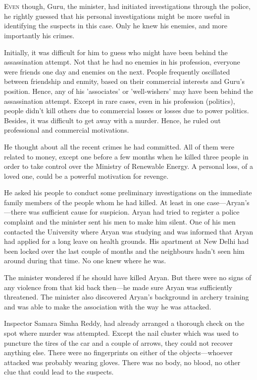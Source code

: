 \chapter{}

\lettrine{E}{ven} though, Guru, the minister, had initiated investigations through the
police, he rightly guessed that his personal investigations might be more useful
in identifying the suspects in this case. Only he knew his enemies, and more
importantly his crimes.

Initially, it was difficult for him to guess who might have been behind the
assassination attempt. Not that he had no enemies in his profession, everyone
were friends one day and enemies on the next. People frequently oscillated
between friendship and enmity, based on their commercial interests and Guru's
position. Hence, any of his 'associates' or 'well-wishers' may have been behind
the assassination attempt. Except in rare cases, even in his profession
(politics), people didn't kill others due to commercial losses or losses due to
power politics. Besides, it was difficult to get away with a murder. Hence, he
ruled out professional and commercial motivations.

He thought about all the recent crimes he had committed. All of them were
related to money, except one before a few months when he killed three people in
order to take control over the Ministry of Renewable Energy. A personal loss, of
a loved one, could be a powerful motivation for revenge.

He asked his people to conduct some preliminary investigations on the immediate
family members of the people whom he had killed. At least in one
case—Aryan's—there was sufficient cause for suspicion. Aryan had tried to register
a police
complaint and the minister sent his men to make him silent. One of his men
contacted the University where Aryan was studying and was informed that Aryan
had applied for a long leave on health grounds. His apartment at New Delhi had
been locked over the last couple of months and the neighbours hadn't seen him
around during that time. No one knew where he was.

The minister wondered if he should have killed Aryan. But there were no signs of
any violence from that kid back then—he made sure Aryan was sufficiently
threatened. The minister also discovered Aryan's background in archery training
and was able to make the association with the way he was attacked.

Inspector Samara Simha Reddy, had already arranged a thorough check on the
spot where murder was attempted. Except the nail cluster which was used to
puncture the tires of the car and a couple of arrows, they could not recover
anything else. There were no fingerprints on either of the objects—whoever
attacked was probably wearing gloves. There was no body, no blood, no other clue
that could lead to the suspects.

